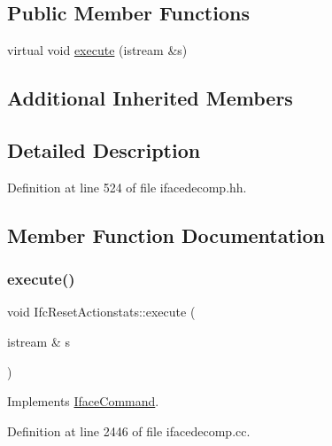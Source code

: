\subsection*{Public Member Functions}
\begin{DoxyCompactItemize}
\item 
virtual void \mbox{\hyperlink{class_ifc_reset_actionstats_a814bf0bc991a7b943643f5e72b507ea5}{execute}} (istream \&s)
\end{DoxyCompactItemize}
\subsection*{Additional Inherited Members}


\subsection{Detailed Description}


Definition at line 524 of file ifacedecomp.\+hh.



\subsection{Member Function Documentation}
\mbox{\label{class_ifc_reset_actionstats_a814bf0bc991a7b943643f5e72b507ea5}} 
\subsubsection{\texorpdfstring{execute()}{execute()}}
{\footnotesize\ttfamily void Ifc\+Reset\+Actionstats\+::execute (\begin{DoxyParamCaption}\item[{istream \&}]{s }\end{DoxyParamCaption})\hspace{0.3cm}{\ttfamily [virtual]}}



Implements \mbox{\hyperlink{class_iface_command_af10e29cee2c8e419de6efe9e680ad201}{Iface\+Command}}.



Definition at line 2446 of file ifacedecomp.\+cc.


